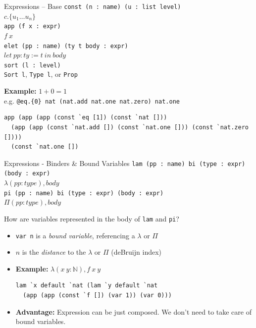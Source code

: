 \documentclass[usenames,dvipsnames]{beamer}
\begin{document}
\begin{frame}[fragile]{Expressions -- Base}
  \lstinline$const (n : name) (u : list level)$ \\
  \quad $c.\{u_1 \ldots u_n\}$ \\[2ex]
\pause
  \lstinline$app (f x : expr)$ \\
  \quad $f~x$ \\[2ex]
  \pause
  \lstinline$elet (pp : name) (ty t body : expr)$ \\
  \quad $let~pp : ty := t~in~body$ \\[2ex]
\pause
  \lstinline$sort (l : level)$ \\
  \quad \lstinline$Sort l$, \lstinline$Type l$, or \lstinline$Prop$ \\[2ex]
\pause

  \textbf{Example:} $1 + 0 = 1$ \\
   e.g. \lstinline$@eq.{0} nat (nat.add nat.one nat.zero) nat.one$
\begin{lstlisting}
app (app (app (const `eq [1]) (const `nat []))
  (app (app (const `nat.add []) (const `nat.one [])) (const `nat.zero [])))
  (const `nat.one [])
\end{lstlisting}
\end{frame}

\begin{frame}[fragile]{Expressions - Binders \& Bound Variables}
  \lstinline$lam (pp : name) bi (type : expr) (body : expr)$ \\
  \quad $\lambda (pp : type), body$ \\[2ex]
  \lstinline$pi (pp : name) bi (type : expr) (body : expr)$ \\
  \quad $\Pi (pp : type), body$ \\[2ex]
  \pause

  How are variables represented in the body of \texttt{lam} and \texttt{pi}?
  \begin{itemize}[<+->]
    \item \lstinline{var n} is a \emph{bound variable}, referencing a $\lambda$ or $\Pi$
    \item $n$ is the \emph{distance} to the $\lambda$ or $\Pi$ (deBruijn index)
    \item \textbf{Example:} $\lambda (x~y : \mathbb{N}), f~x~y$
\begin{lstlisting}
lam `x default `nat (lam `y default `nat
  (app (app (const `f []) (var 1)) (var 0)))
\end{lstlisting}
    \item \textbf{Advantage:} Expression can be just composed. We don't need to take care of bound variables.
  \end{itemize}
\end{frame}
\end{document}
